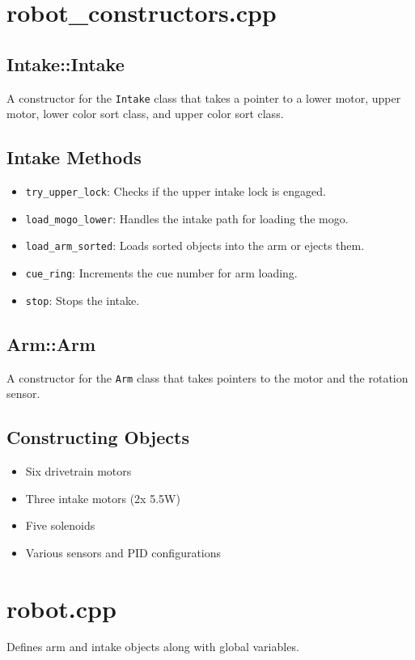 \section*{robot\_constructors.cpp}
\subsection*{Intake::Intake}
A constructor for the \texttt{Intake} class that takes a pointer to a lower motor, upper motor, lower color sort class, and upper color sort class.

\subsection*{Intake Methods}
\begin{itemize}[noitemsep]
    \item \texttt{try\_upper\_lock}: Checks if the upper intake lock is engaged.
    \item \texttt{load\_mogo\_lower}: Handles the intake path for loading the mogo.
    \item \texttt{load\_arm\_sorted}: Loads sorted objects into the arm or ejects them.
    \item \texttt{cue\_ring}: Increments the cue number for arm loading.
    \item \texttt{stop}: Stops the intake.
\end{itemize}

\subsection*{Arm::Arm}
A constructor for the \texttt{Arm} class that takes pointers to the motor and the rotation sensor.

\subsection*{Constructing Objects}
\begin{itemize}[noitemsep]
    \item Six drivetrain motors
    \item Three intake motors (2x 5.5W)
    \item Five solenoids
    \item Various sensors and PID configurations
\end{itemize}

\section*{robot.cpp}
Defines arm and intake objects along with global variables.

